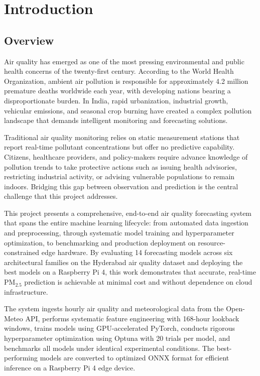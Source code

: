 \chapter{Introduction}

\section{Overview}

Air quality has emerged as one of the most pressing environmental and public health concerns of the twenty-first century. According to the World Health Organization, ambient air pollution is responsible for approximately 4.2 million premature deaths worldwide each year, with developing nations bearing a disproportionate burden. In India, rapid urbanization, industrial growth, vehicular emissions, and seasonal crop burning have created a complex pollution landscape that demands intelligent monitoring and forecasting solutions.

Traditional air quality monitoring relies on static measurement stations that report real-time pollutant concentrations but offer no predictive capability. Citizens, healthcare providers, and policy-makers require advance knowledge of pollution trends to take protective actions such as issuing health advisories, restricting industrial activity, or advising vulnerable populations to remain indoors. Bridging this gap between observation and prediction is the central challenge that this project addresses.

This project presents a comprehensive, end-to-end air quality forecasting system that spans the entire machine learning lifecycle: from automated data ingestion and preprocessing, through systematic model training and hyperparameter optimization, to benchmarking and production deployment on resource-constrained edge hardware. By evaluating 14 forecasting models across six architectural families on the Hyderabad air quality dataset and deploying the best models on a Raspberry Pi 4, this work demonstrates that accurate, real-time PM$_{2.5}$ prediction is achievable at minimal cost and without dependence on cloud infrastructure.

The system ingests hourly air quality and meteorological data from the Open-Meteo API, performs systematic feature engineering with 168-hour lookback windows, trains models using GPU-accelerated PyTorch, conducts rigorous hyperparameter optimization using Optuna with 20 trials per model, and benchmarks all models under identical experimental conditions. The best-performing models are converted to optimized ONNX format for efficient inference on a Raspberry Pi 4 edge device.

